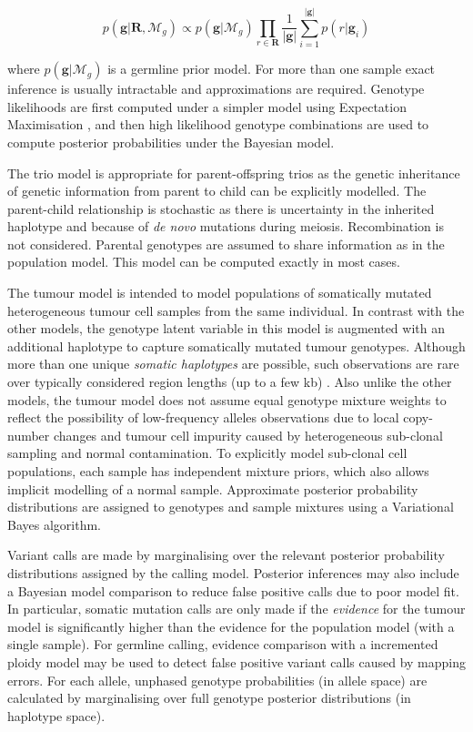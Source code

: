 \documentclass[notitlepage, twocolumn]{article}
\begin{document}
\begin{equation*}
    p(\boldsymbol{g} | \boldsymbol{R}, \mathcal{M}_{g}) \propto p(\boldsymbol{g} | \mathcal{M}_{g}) \prod_{r \in \boldsymbol{R}} \frac{1}{|\boldsymbol{g}|} \sum_{i = 1}^{|\boldsymbol{g}|} p(r | \boldsymbol{g}_i)
\end{equation*}

where $p(\boldsymbol{g} | \mathcal{M}_{g})$ is a germline prior model. For more than one sample exact inference is usually intractable and approximations are required. Genotype likelihoods are first computed under a simpler model using Expectation Maximisation \cite{RN5}, and then high likelihood genotype combinations are used to compute posterior probabilities under the Bayesian model.

The trio model is appropriate for parent-offspring trios as the genetic inheritance of genetic information from parent to child can be explicitly modelled. The parent-child relationship is stochastic as there is uncertainty in the inherited haplotype and because of \emph{de novo} mutations during meiosis. Recombination is not considered. Parental genotypes are assumed to share information as in the population model. This model can be computed exactly in most cases.

The tumour model is intended to model populations of somatically mutated heterogeneous tumour cell samples from the same individual. In contrast with the other models, the genotype latent variable in this model is augmented with an additional haplotype to capture somatically mutated tumour genotypes. Although more than one unique \emph{somatic haplotypes} are possible, such observations are rare over typically considered region lengths (up to a few kb) \cite{RN86}. Also unlike the other models, the tumour model does not assume equal genotype mixture weights to reflect the possibility of low-frequency alleles observations due to local copy-number changes and tumour cell impurity caused by heterogeneous sub-clonal sampling and normal contamination. To explicitly model sub-clonal cell populations, each sample has independent mixture priors, which also allows implicit modelling of a normal sample. Approximate posterior probability distributions are assigned to genotypes and sample mixtures using a Variational Bayes algorithm.

Variant calls are made by marginalising over the relevant posterior probability distributions assigned by the calling model. Posterior inferences may also include a Bayesian model comparison to reduce false positive calls due to poor model fit. In particular, somatic mutation calls are only made if the \emph{evidence} for the tumour model is significantly higher than the evidence for the population model (with a single sample). For germline calling, evidence comparison with a incremented ploidy model may be used to detect false positive variant calls caused by mapping errors. For each allele, unphased genotype probabilities (in allele space) are calculated by marginalising over full genotype posterior distributions (in haplotype space).
\end{document}
